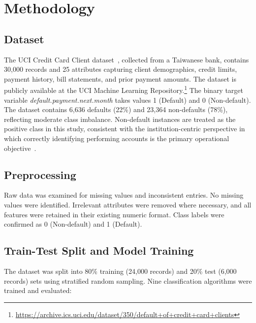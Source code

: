 \documentclass[sigconf]{acmart}
\begin{document}
\section{Methodology}

\subsection{Dataset}
The UCI Credit Card Client dataset~\cite{yeh2009comparisons}, collected from a Taiwanese bank, contains 30,000 records and 25 attributes capturing client demographics, credit limits, payment history, bill statements, and prior payment amounts. The dataset is publicly available at the UCI Machine Learning Repository.\footnote{\url{https://archive.ics.uci.edu/dataset/350/default+of+credit+card+clients}} The binary target variable \textit{default.payment.next.month} takes values 1 (Default) and 0 (Non-default). The dataset contains 6,636 defaults (22\%) and 23,364 non-defaults (78\%), reflecting moderate class imbalance. Non-default instances are treated as the positive class in this study, consistent with the institution-centric perspective in which correctly identifying performing accounts is the primary operational objective~\cite{brown2012experiment}.

\subsection{Preprocessing}
Raw data was examined for missing values and inconsistent entries. No missing values were identified. Irrelevant attributes were removed where necessary, and all features were retained in their existing numeric format. Class labels were confirmed as 0 (Non-default) and 1 (Default).

\subsection{Train-Test Split and Model Training}
The dataset was split into 80\% training (24,000 records) and 20\% test (6,000 records) sets using stratified random sampling. Nine classification algorithms were trained and evaluated:
\end{document}
